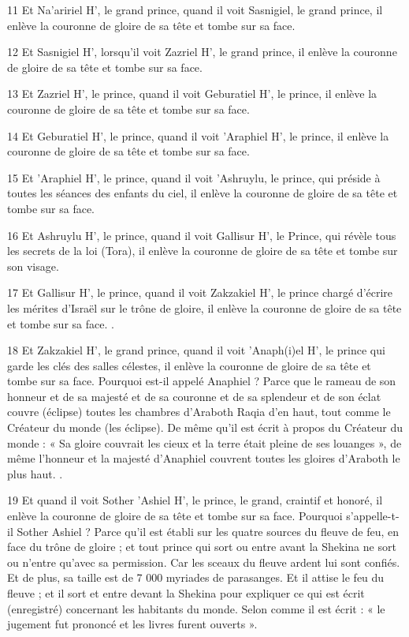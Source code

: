 \par 11 Et Na'aririel H', le grand prince, quand il voit Sasnigiel, le grand prince, il enlève la couronne de gloire de sa tête et tombe sur sa face.

\par 12 Et Sasnigiel H', lorsqu'il voit Zazriel H', le grand prince, il enlève la couronne de gloire de sa tête et tombe sur sa face.

\par 13 Et Zazriel H', le prince, quand il voit Geburatiel H', le prince, il enlève la couronne de gloire de sa tête et tombe sur sa face.

\par 14 Et Geburatiel H', le prince, quand il voit 'Araphiel H', le prince, il enlève la couronne de gloire de sa tête et tombe sur sa face.

\par 15 Et 'Araphiel H', le prince, quand il voit 'Ashruylu, le prince, qui préside à toutes les séances des enfants du ciel, il enlève la couronne de gloire de sa tête et tombe sur sa face.

\par 16 Et Ashruylu H', le prince, quand il voit Gallisur H', le Prince, qui révèle tous les secrets de la loi (Tora), il enlève la couronne de gloire de sa tête et tombe sur son visage.

\par 17 Et Gallisur H', le prince, quand il voit Zakzakiel H', le prince chargé d'écrire les mérites d'Israël sur le trône de gloire, il enlève la couronne de gloire de sa tête et tombe sur sa face. .

\par 18 Et Zakzakiel H', le grand prince, quand il voit 'Anaph(i)el H', le prince qui garde les clés des salles célestes, il enlève la couronne de gloire de sa tête et tombe sur sa face. Pourquoi est-il appelé Anaphiel ? Parce que le rameau de son honneur et de sa majesté et de sa couronne et de sa splendeur et de son éclat couvre (éclipse) toutes les chambres d'Araboth Raqia d'en haut, tout comme le Créateur du monde (les éclipse). De même qu'il est écrit à propos du Créateur du monde : « Sa gloire couvrait les cieux et la terre était pleine de ses louanges », de même l'honneur et la majesté d'Anaphiel couvrent toutes les gloires d'Araboth le plus haut. .

\par 19 Et quand il voit Sother 'Ashiel H', le prince, le grand, craintif et honoré, il enlève la couronne de gloire de sa tête et tombe sur sa face. Pourquoi s'appelle-t-il Sother Ashiel ? Parce qu'il est établi sur les quatre sources du fleuve de feu, en face du trône de gloire ; et tout prince qui sort ou entre avant la Shekina ne sort ou n'entre qu'avec sa permission. Car les sceaux du fleuve ardent lui sont confiés. Et de plus, sa taille est de 7 000 myriades de parasanges. Et il attise le feu du fleuve ; et il sort et entre devant la Shekina pour expliquer ce qui est écrit (enregistré) concernant les habitants du monde. Selon comme il est écrit : « le jugement fut prononcé et les livres furent ouverts ».

